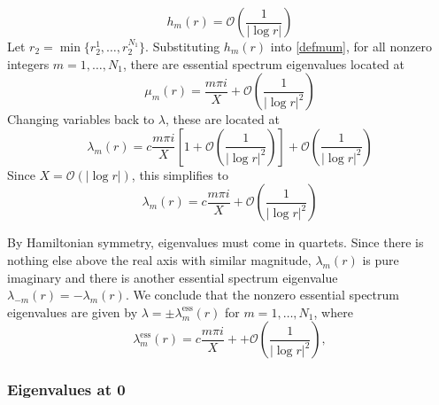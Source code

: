 \documentclass[thesis.tex]{subfiles}
\begin{document}
\[
h_m(r) = \mathcal{O}\left( \frac{1}{|\log r|} \right)
\]
Let $r_2 = \min\{ r_2^1, \dots, r_2^{N_1} \}$. Substituting $h_m(r)$ into \cref{defmum}, for all nonzero integers $m = 1, \dots, N_1$, there are essential spectrum eigenvalues located at
\[
\mu_m(r) = \frac{m \pi i}{X} + \mathcal{O}\left( \frac{1}{|\log r|^2} \right)
\]
Changing variables back to $\lambda$, these are located at
\[
\lambda_m(r) = c \frac{m \pi i}{X}\left[1 + \mathcal{O}\left( \frac{1}{|\log r|^2} \right) \right] +\mathcal{O}\left( \frac{1}{|\log r|^2} \right)
\]
Since $X = \mathcal{O}(|\log r|)$, this simplifies to
\[
\lambda_m(r) = c \frac{m \pi i}{X} +\mathcal{O}\left( \frac{1}{|\log r|^2} \right)
\]

By Hamiltonian symmetry, eigenvalues must come in quartets. Since there is nothing else above the real axis with similar magnitude, $\lambda_m(r)$ is pure imaginary and there is another essential spectrum eigenvalue $\lambda_{-m}(r) = -\lambda_m(r)$. We conclude that the nonzero essential spectrum eigenvalues are given by $\lambda = \pm \lambda_m^{\text{ess}}(r)$ for $m = 1, \dots, N_1$, where
\[
\lambda_m^{\text{ess}}(r) = c \frac{m \pi i}{X} + +\mathcal{O}\left( \frac{1}{|\log r|^2} \right),
\]

\subsubsection{Eigenvalues at 0}
\end{document}
